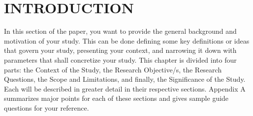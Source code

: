 \chapter{INTRODUCTION}

In this section of the paper, you want to provide the general background and motivation of your study. This can be done defining some key definitions or ideas that govern your study, presenting your context, and narrowing it down with parameters that shall concretize your study. 
This chapter is divided into four parts: the Context of the Study, the Research Objective/s, the Research Questions, the Scope and Limitations, and finally, the Significance of the Study. Each will be described in greater detail in their respective sections. Appendix A summarizes major points for each of these sections and gives sample guide questions for your reference.







